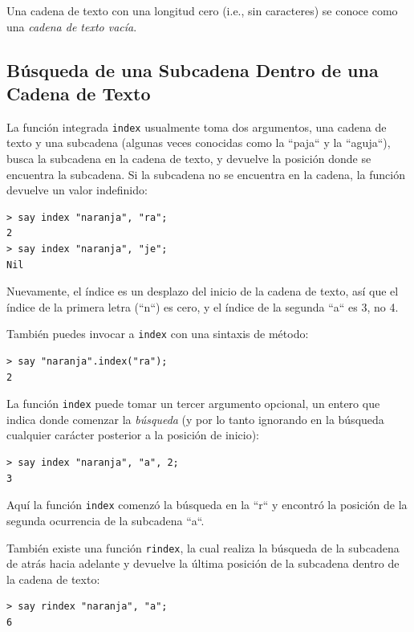 Una cadena de texto con una longitud cero (i.e., sin caracteres) se
conoce como una \emph{cadena de texto vacía}.

\subsection{Búsqueda de una Subcadena Dentro de una Cadena de Texto}
\label{find}

La función integrada {\tt index} usualmente toma dos argumentos,
una cadena de texto y una subcadena (algunas veces conocidas como
la ``paja`` y la ``aguja``), busca la subcadena en la cadena de texto,
y devuelve la posición donde se encuentra la subcadena. Si la subcadena
no se encuentra en la cadena, la función devuelve un valor indefinido:

\begin{verbatim}
> say index "naranja", "ra";
2
> say index "naranja", "je";
Nil
\end{verbatim}
%

Nuevamente, el índice es un desplazo del inicio de la cadena 
de texto, así que el índice de la primera letra (``n``) es cero,
y el índice de la segunda ``a`` es 3, no 4.

También puedes invocar a {\tt index} con una sintaxis de método:
\begin{verbatim}
> say "naranja".index("ra");
2
\end{verbatim}
%

La función {\tt index} puede tomar un tercer argumento opcional,
un entero que indica donde comenzar la \emph{búsqueda} (y por lo
tanto ignorando en la búsqueda cualquier carácter posterior a
la posición de inicio):

\begin{verbatim}
> say index "naranja", "a", 2;
3
\end{verbatim}
%
Aquí la función {\tt index} comenzó la búsqueda en la ``r`` y encontró 
la posición de la segunda ocurrencia de la subcadena ``a``.
 

También existe una función {\tt rindex}, la cual realiza la búsqueda
de la subcadena de atrás hacia adelante y devuelve la última posición de 
la subcadena dentro de la cadena de texto:

\begin{verbatim}
> say rindex "naranja", "a";
6
\end{verbatim}
%


